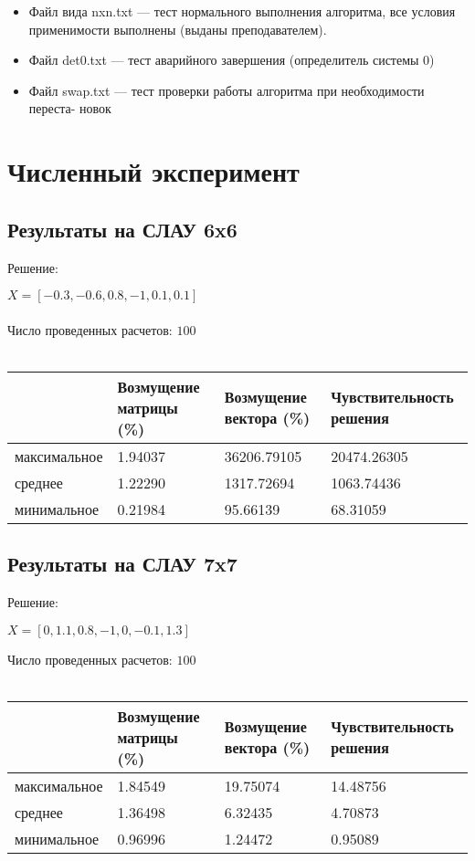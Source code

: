 \documentclass[paper=a4, fontsize=11pt]{scrartcl} %
\numberwithin{equation}{section} %
\numberwithin{figure}{section} %
\numberwithin{table}{section} %
\begin{document}
\begin{itemize}
	\item Файл вида nxn.txt — тест нормального выполнения алгоритма, все условия применимости выполнены (выданы преподавателем).
    
	\item Файл det0.txt — тест аварийного завершения (определитель системы 0)

	\item Файл swap.txt — тест проверки работы алгоритма при необходимости переста- новок

\end{itemize}


\section{Численный эксперимент}

\subsection{Результаты на СЛАУ 6x6}
Решение:

$X = [-0.3,-0.6, 0.8, -1, 0.1, 0.1]$
\\
\\
Число проведенных расчетов: $100$
\\
\\
\begin{tabular}{|p{3 cm}|p{4 cm}|p{4 cm}|p{3.5 cm}|}
\hline
	& Возмущение матрицы (\%) & Возмущение вектора (\%) & Чувствительность решения\\
\hline
	максимальное & 1.94037 & 36206.79105 & 20474.26305\\
\hline
	среднее & 1.22290 & 1317.72694 & 1063.74436\\
\hline
	минимальное & 0.21984 & 95.66139 & 68.31059\\
\hline
\end{tabular}

\subsection{Результаты на СЛАУ 7x7}
Решение:

$X = [0, 1.1, 0.8, -1, 0, -0.1, 1.3]$

Число проведенных расчетов: $100$
\\
\\
\begin{tabular}{|p{3 cm}|p{4 cm}|p{4 cm}|p{3.5 cm}|}
\hline
	& Возмущение матрицы (\%) & Возмущение вектора (\%) & Чувствительность решения\\
\hline
	максимальное & 1.84549 & 19.75074 & 14.48756\\
\hline
	среднее & 1.36498 & 6.32435 & 4.70873\\
\hline
	минимальное & 0.96996 & 1.24472 & 0.95089\\
\hline
\end{tabular}
\end{document}
